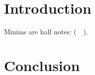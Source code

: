 \documentclass{vcscores}
\begin{document}
\tableofcontents
\chapter{Introduction}

Minims are half notes: (\musMinim\ \musMinim\ \musMinim).
\lipsum
\chapter{Conclusion}
\lipsum
\end{document}
